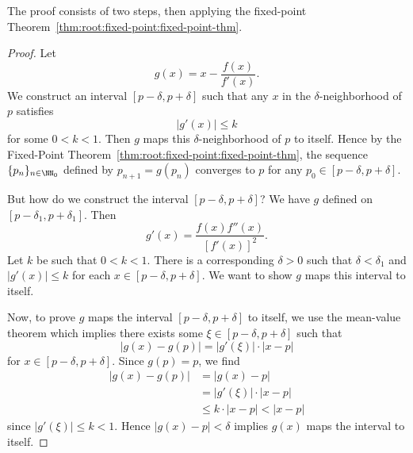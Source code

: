 The proof consists of two steps, then applying the fixed-point Theorem~\ref{thm:root:fixed-point:fixed-point-thm}.

\begin{proof}
  Let
  \begin{equation}
    g(x) = x - \frac{f(x)}{f'(x)}.
  \end{equation}
  We construct an interval $[p-\delta, p+\delta]$ such that any $x$ in
  the $\delta$-neighborhood of $p$ satisfies
  \begin{equation}
    |g'(x)|\leq k
  \end{equation}
  for some $0<k<1$. Then $g$ maps this $\delta$-neighborhood of $p$ to
  itself.
  Hence by the Fixed-Point Theorem~\ref{thm:root:fixed-point:fixed-point-thm},
  the sequence $\{p_{n}\}_{n\in\NN_{0}}$ defined by $p_{n+1}=g(p_{n})$
  converges to $p$ for any $p_{0}\in[p-\delta,p+\delta]$.

  But how do we construct the interval $[p-\delta, p+\delta]$?
  We have $g$ defined on $[p-\delta_{1},p+\delta_{1}]$. Then
  \begin{equation}
    g'(x) = \frac{f(x)f''(x)}{[f'(x)]^{2}}.
  \end{equation}
  Let $k$ be such that $0<k<1$. There is a corresponding $\delta>0$ such
  that $\delta<\delta_{1}$ and $|g'(x)|\leq k$ for each $x\in[p-\delta,p+\delta]$.
  We want to show $g$ maps this interval to itself.

  Now, to prove $g$ maps the interval $[p-\delta,p+\delta]$ to itself,
  we use the mean-value theorem which implies there exists some
  $\xi\in[p-\delta,p+\delta]$ such that
  \begin{equation}
    |g(x)-g(p)| = |g'(\xi)|\cdot|x-p|
  \end{equation}
  for $x\in[p-\delta,p+\delta]$. Since $g(p)=p$, we find
  \begin{subequations}
    \begin{align}
      |g(x) - g(p)|
      &= |g(x) - p|\\
      &= |g'(\xi)|\cdot|x-p|\\
      &\leq k\cdot|x-p| < |x-p|
    \end{align}
  \end{subequations}
  since $|g'(\xi)|\leq k<1$. Hence $|g(x)-p|<\delta$ implies $g(x)$ maps
  the interval to itself.
\end{proof}

